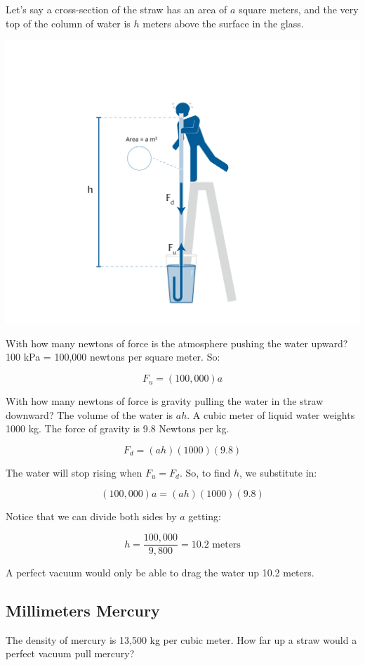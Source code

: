 Let's say a cross-section of the straw has an area of $a$ square meters, and the very top of the 
column of water is $h$ meters above the surface in the glass. 

\includegraphics[width=\textwidth]{tallStraw.png}


With how many newtons of force is the atmosphere pushing the water upward?  100 kPa = 100,000 newtons per square meter.  So:

$$F_u = (100,000)a$$

With how many newtons of force is gravity pulling the water in the straw downward?  The volume of the water is $ah$.  A cubic meter of liquid water weights 1000 kg.  The force of gravity is 9.8 Newtons per kg.

$$F_d = (ah)(1000)(9.8)$$

The water will stop rising when $F_u = F_d$.  So, to find $h$, we substitute in:

$$(100,000)a = (ah)(1000)(9.8)$$

Notice that we can divide both sides by $a$ getting:

$$h = \frac{100,000}{9,800} = 10.2 \text{ meters}$$

A perfect vacuum would only be able to drag the water up 10.2 meters.

\subsection{Millimeters Mercury}

The density of mercury is 13,500 kg per cubic meter.  How far up a straw would a perfect vacuum pull mercury? 

